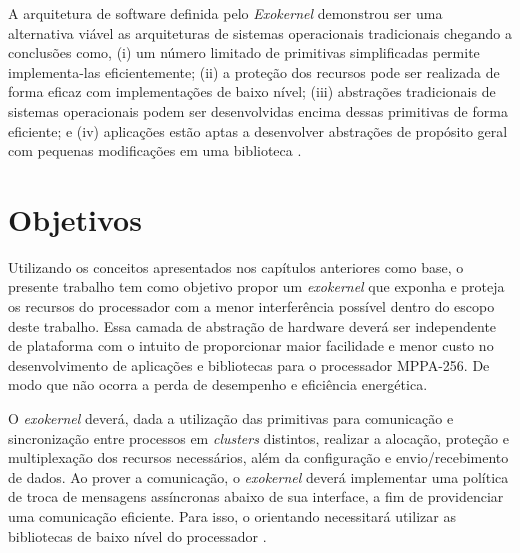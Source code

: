 \documentclass[
	12pt,				%
	openright,			%
	twoside,			%
	a4paper,			%
	english,			%
	brazil,				%
	]{abntex2}
\begin{document}
        A arquitetura de software definida pelo \textit{Exokernel} demonstrou ser uma alternativa viável as arquiteturas de sistemas operacionais tradicionais chegando a conclusões como, (i) um número limitado de primitivas simplificadas permite implementa-las eficientemente; (ii) a proteção dos recursos pode ser realizada de forma eficaz com implementações de baixo nível; (iii) abstrações tradicionais de sistemas operacionais podem ser desenvolvidas encima dessas primitivas de forma eficiente; e (iv) aplicações estão aptas a desenvolver abstrações de propósito geral com pequenas modificações em uma biblioteca \cite{engler_exokernel:_1995}.
    
\chapter{Objetivos}
\label{cap:objetivos}

    Utilizando os conceitos apresentados nos capítulos anteriores como base, o presente trabalho tem como objetivo propor um \textit{exokernel} que exponha e proteja os recursos do processador \mppa com a menor interferência possível dentro do escopo deste trabalho.
    Essa camada de abstração de hardware deverá ser independente de plataforma com o intuito de proporcionar maior facilidade e menor custo no desenvolvimento de aplicações e bibliotecas para o processador MPPA-256. De modo que não ocorra a perda de desempenho e eficiência energética.
    
    O \textit{exokernel} deverá, dada a utilização das primitivas \ipc para comunicação e sincronização entre processos em \textit{clusters} distintos, realizar a alocação, proteção e multiplexação dos recursos necessários, além da configuração e envio/recebimento de dados.
    Ao prover a comunicação, o \textit{exokernel} deverá implementar uma política de troca de mensagens assíncronas abaixo de sua interface, a fim de providenciar uma comunicação eficiente.
    Para isso, o orientando necessitará utilizar as bibliotecas de baixo nível do processador \mppa. 
    
\end{document}
